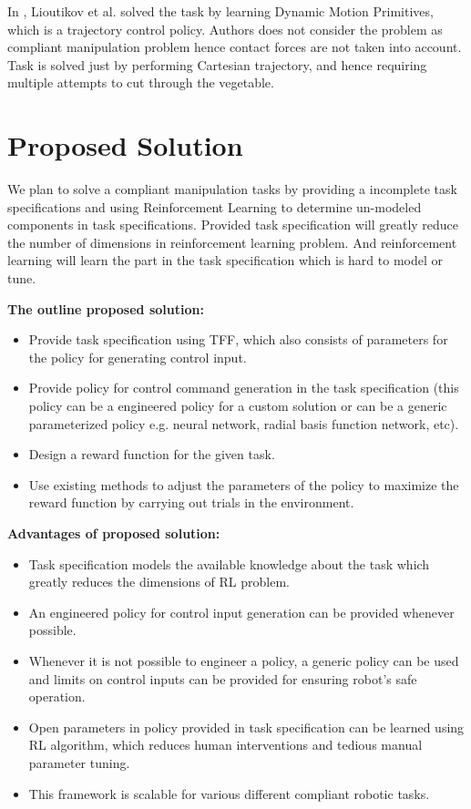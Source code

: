 \documentclass[thesis]{mas_proposal}
\begin{document}
In \cite{lioutikov2016learning}, Lioutikov et al. solved the task by learning Dynamic Motion Primitives, which is a trajectory control policy. Authors does not consider the problem as compliant manipulation problem hence contact forces are not taken into account. Task is solved just by performing Cartesian trajectory, and hence requiring multiple attempts to cut through the vegetable. 


\chapter{Proposed Solution}

We plan to solve a compliant manipulation tasks by providing a incomplete task specifications and using Reinforcement Learning to determine un-modeled components in task specifications. Provided task specification will greatly reduce the number of dimensions in reinforcement learning problem. And reinforcement learning will learn the part in the task specification which is hard to model or tune.



\textbf{The outline proposed solution:}
\begin{itemize}
	\item Provide task specification using TFF, which also consists of parameters for the policy for generating control input.
	\item Provide policy for control command generation in the task specification (this policy can be a engineered policy for a custom solution or can be a generic parameterized policy e.g. neural network, radial basis function network, etc).
	\item Design a reward function for the given task.
	\item Use existing methods to adjust the parameters of the policy to maximize the reward function by carrying out trials in the environment.
\end{itemize}

\textbf{Advantages of proposed solution:}
\begin{itemize}
	\item Task specification models the available knowledge about the task which greatly reduces the dimensions of RL problem.
	\item An engineered policy for control input generation can be provided whenever possible. 
	\item Whenever it is not possible to engineer a policy, a generic policy can be used and limits on control inputs can be provided for ensuring robot's safe operation.
	\item Open parameters in policy provided in task specification can be learned using RL algorithm, which reduces human interventions and tedious manual parameter tuning. 
	\item This framework is scalable for various different compliant robotic tasks.  
\end{itemize}
\end{document}
